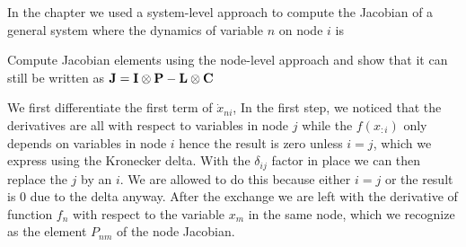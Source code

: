 In the chapter we used a system-level approach to compute the Jacobian of a general system where the dynamics of variable $n$ on node $i$ is 

\subquestion 
Compute Jacobian elements using the node-level approach
and show that it can still be written as ${\bf J}={\bf I}\otimes {\bf P}-{\bf L}\otimes{\bf C}$

\solution
We first differentiate the first term of $\dot{x}_{ni}$, 
In the first step, we noticed that the derivatives are all with respect to variables in node $j$ while the $f(x_{:i})$ only depends on variables in node $i$ hence the result is zero unless $i=j$, which we express using the Kronecker delta. With the $\delta_{ij}$ factor in place we can then replace the $j$ by an $i$. We are allowed to do this because either $i=j$ or the result is 0 due to the delta anyway. After the exchange we are left with the derivative of function $f_n$ with respect to the variable $x_m$ in the same node, which we recognize as the element $P_{nm}$ of the node Jacobian.  

